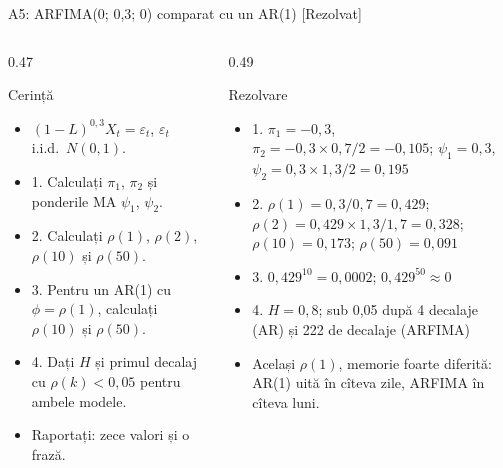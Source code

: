 \begin{frame}{A5: ARFIMA(0; 0,3; 0) comparat cu un AR(1) [Rezolvat]}
\itemsize{\scriptsize}
\begin{columns}[T]
\begin{column}{0.47\textwidth}
\begin{block}{Cerință}
\begin{itemize}
    \item $(1 - L)^{0{,}3}X_t = \varepsilon_t$, $\varepsilon_t$ i.i.d.\ $N(0, 1)$.
    \item 1. Calculați $\pi_1$, $\pi_2$ și ponderile MA $\psi_1$, $\psi_2$.
    \item 2. Calculați $\rho(1)$, $\rho(2)$, $\rho(10)$ și $\rho(50)$.
    \item 3. Pentru un AR(1) cu $\phi = \rho(1)$, calculați $\rho(10)$ și $\rho(50)$.
    \item 4. Dați $H$ și primul decalaj cu $\rho(k) < 0{,}05$ pentru ambele modele.
    \item Raportați: zece valori și o frază.
\end{itemize}
\end{block}
\end{column}
\begin{column}{0.49\textwidth}
\begin{exampleblock}{Rezolvare}
\begin{itemize}
    \item 1. $\pi_1 = -0{,}3$, $\pi_2 = -0{,}3 \times 0{,}7/2 = -0{,}105$; $\psi_1 = 0{,}3$, $\psi_2 = 0{,}3 \times 1{,}3/2 = 0{,}195$
    \item 2. $\rho(1) = 0{,}3/0{,}7 = 0{,}429$; $\rho(2) = 0{,}429 \times 1{,}3/1{,}7 = 0{,}328$; $\rho(10) = 0{,}173$; $\rho(50) = 0{,}091$
    \item 3. $0{,}429^{10} = 0{,}0002$; $0{,}429^{50} \approx 0$
    \item 4. $H = 0{,}8$; sub 0,05 după 4 decalaje (AR) și 222 de decalaje (ARFIMA)
    \item Același $\rho(1)$, memorie foarte diferită: AR(1) uită în cîteva zile, ARFIMA în cîteva luni.
\end{itemize}
\end{exampleblock}
\end{column}
\end{columns}
\end{frame}

